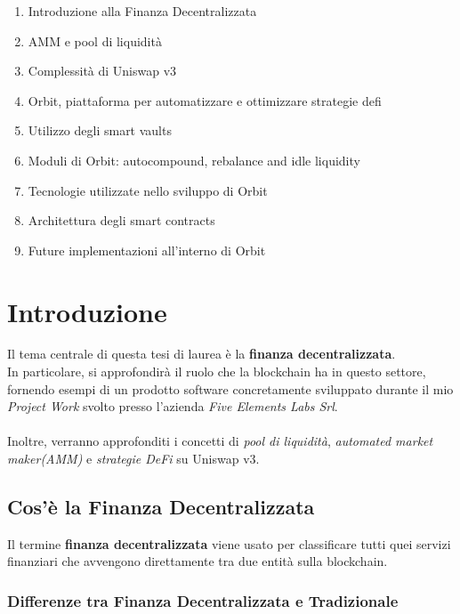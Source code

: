\documentclass{report}
\begin{document}
\tableofcontents

\begin{enumerate}
\item Introduzione alla Finanza Decentralizzata
\item AMM e pool di liquidità
\item Complessità di Uniswap v3
\item Orbit, piattaforma per automatizzare e ottimizzare strategie defi
\item Utilizzo degli smart vaults
\item Moduli di Orbit: autocompound, rebalance and idle liquidity
\item Tecnologie utilizzate nello sviluppo di Orbit
\item Architettura degli smart contracts
\item Future implementazioni all'interno di Orbit
\end{enumerate}





\chapter{Introduzione}
Il tema centrale di questa tesi di laurea è la \textbf{finanza decentralizzata}.\\ In particolare, si approfondirà il ruolo che la blockchain ha in questo settore, fornendo esempi di un prodotto software concretamente sviluppato durante il mio  \textit{Project Work} svolto presso l'azienda \textit{Five Elements Labs Srl}.
\\\\Inoltre, verranno approfonditi i concetti di \textit{pool di liquidità}, \textit{automated market maker(AMM)} e \textit{strategie DeFi} su Uniswap v3.

\section{Cos'è la Finanza Decentralizzata}

Il termine \textbf{finanza decentralizzata} viene usato per classificare tutti quei servizi finanziari che avvengono direttamente tra due entità sulla blockchain.

\subsection{Differenze tra Finanza Decentralizzata e Tradizionale}
\end{document}
